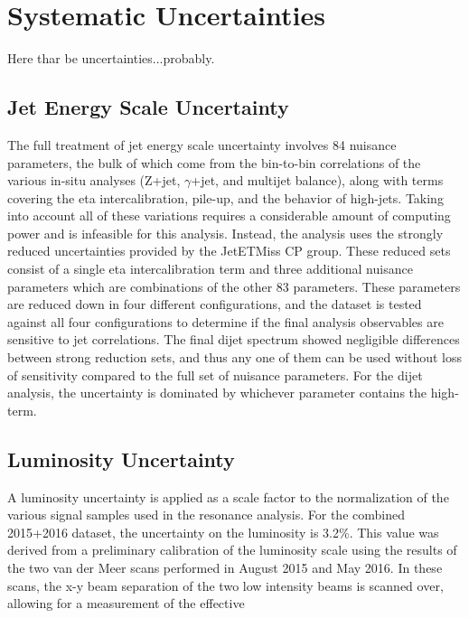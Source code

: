 
\chapter{Systematic Uncertainties}
\label{ch:Uncertainties}
Here thar be uncertainties...probably.

\section{Jet Energy Scale Uncertainty}
The full treatment of jet energy scale uncertainty involves 84 nuisance parameters, the bulk of which come from the bin-to-bin correlations of the various in-situ analyses (Z+jet, $\gamma$+jet, and multijet balance), along with terms covering the eta intercalibration, pile-up, and the behavior of high-\pt jets.  Taking into account all of these variations requires a considerable amount of computing power and is infeasible for this analysis.  Instead, the analysis uses the strongly reduced uncertainties provided by the JetETMiss CP group.  These reduced sets consist of a single eta intercalibration term and three additional nuisance parameters which are combinations of the other 83 parameters.  These parameters are reduced down in four different configurations, and the dataset is tested against all four configurations to determine if the final analysis observables are sensitive to jet correlations.  The final dijet spectrum showed negligible differences between strong reduction sets, and thus any one of them can be used without loss of sensitivity compared to the full set of nuisance parameters.  For the dijet analysis, the uncertainty is dominated by whichever parameter contains the high-\pt term.

\section{Luminosity Uncertainty}
A luminosity uncertainty is applied as a scale factor to the normalization of the various signal samples used in the resonance analysis.  For the combined 2015+2016 dataset, the uncertainty on the luminosity is 3.2\%.  This value was derived from a preliminary calibration of the luminosity scale using the results of the two van der Meer scans performed in August 2015 and May 2016.  In these scans, the x-y beam separation of the two low intensity beams is scanned over, allowing for a measurement of the effective 